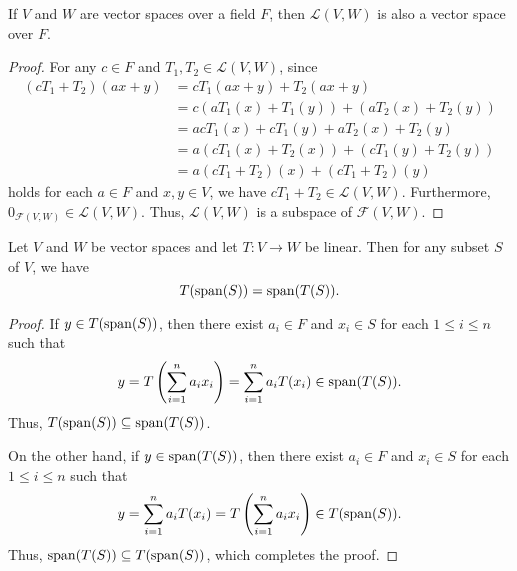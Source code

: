 \begin{theorem}
  \label{thm:linear-transformation-space}
  If $V$ and $W$ are vector spaces over a field $F$, then $\mathcal{L}(V, W)$
  is also a vector space over $F$.
\end{theorem}
\begin{proof}
  For any $c \in F$ and $T_1, T_2 \in \mathcal{L}(V, W)$, since
  \begin{align*}
    (cT_1 + T_2)(ax + y)
    &= cT_1(ax + y) + T_2(ax + y) \tag{linearity of $cT_1 + T_2$} \\
    &= c(aT_1(x) + T_1(y)) + (aT_2(x) + T_2(y)) \tag{linearity of $T_1$ and $T_2$} \\
    &= acT_1(x) + cT_1(y) + aT_2(x) + T_2(y) \\
    &= a(cT_1(x) + T_2(x)) + (cT_1(y) + T_2(y)) \\
    &= a(cT_1 + T_2)(x) + (cT_1 + T_2)(y) \tag{linearity of $cT_1 + T_2$}
  \end{align*}
  holds for each $a \in F$ and $x, y \in V$,
  we have $cT_1 + T_2 \in \mathcal{L}(V, W)$.
  Furthermore, $0_{\mathcal{F}(V, W)} \in \mathcal{L}(V, W)$.
  Thus, $\mathcal{L}(V, W)$ is a subspace of $\mathcal{F}(V, W)$.
\end{proof}

\begin{theorem}
  \label{thm:linear-span}
  Let $V$ and $W$ be vector spaces and let $T: V \to W$ be linear.
  Then for any subset $S$ of $V$, we have
  \begin{equation*}
    T(\operatorname{span}(S)) = \operatorname{span}(T(S)).
  \end{equation*}
\end{theorem}
\begin{proof}
  If $y \in T(\operatorname{span}(S))$, then there exist $a_i \in F$ and $x_i \in S$ for each
  $1 \leq i \leq n$ such that
  \begin{equation*}
    y
    = T\left(\sum_{i=1}^n a_ix_i\right)
    = \sum_{i=1}^n a_iT(x_i)
    \in \operatorname{span}(T(S)).
  \end{equation*}
  Thus, $T(\operatorname{span}(S)) \subseteq \operatorname{span}(T(S))$.
  
  On the other hand, if $y \in \operatorname{span}(T(S))$, then there exist $a_i \in F$ and
  $x_i \in S$ for each $1 \leq i \leq n$ such that
  \begin{equation*}
    y
    = \sum_{i=1}^n a_iT(x_i)
    = T\left(\sum_{i=1}^n a_ix_i\right)
    \in T(\operatorname{span}(S)).
  \end{equation*}
  Thus, $\operatorname{span}(T(S)) \subseteq T(\operatorname{span}(S))$, which completes the proof.
\end{proof}

